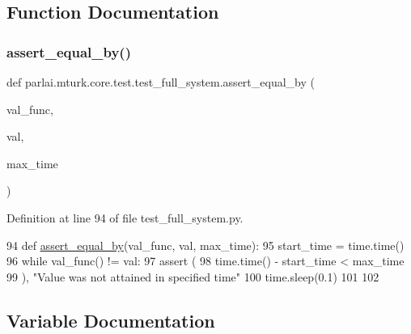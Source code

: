 \subsection{Function Documentation}
\mbox{\label{namespaceparlai_1_1mturk_1_1core_1_1test_1_1test__full__system_a0b463246d35658a2e422010f13dcf819}} 
\subsubsection{\texorpdfstring{assert\+\_\+equal\+\_\+by()}{assert\_equal\_by()}}
{\footnotesize\ttfamily def parlai.\+mturk.\+core.\+test.\+test\+\_\+full\+\_\+system.\+assert\+\_\+equal\+\_\+by (\begin{DoxyParamCaption}\item[{}]{val\+\_\+func,  }\item[{}]{val,  }\item[{}]{max\+\_\+time }\end{DoxyParamCaption})}



Definition at line 94 of file test\+\_\+full\+\_\+system.\+py.


\begin{DoxyCode}
94 \textcolor{keyword}{def }\hyperlink{namespaceparlai_1_1mturk_1_1core_1_1test_1_1test__full__system_a0b463246d35658a2e422010f13dcf819}{assert\_equal\_by}(val\_func, val, max\_time):
95     start\_time = time.time()
96     \textcolor{keywordflow}{while} val\_func() != val:
97         \textcolor{keyword}{assert} (
98             time.time() - start\_time < max\_time
99         ), \textcolor{stringliteral}{"Value was not attained in specified time"}
100         time.sleep(0.1)
101 
102 
\end{DoxyCode}


\subsection{Variable Documentation}
\mbox{\label{namespaceparlai_1_1mturk_1_1core_1_1test_1_1test__full__system_a27d685a0b640f60b477faa936c4857bd}} 
